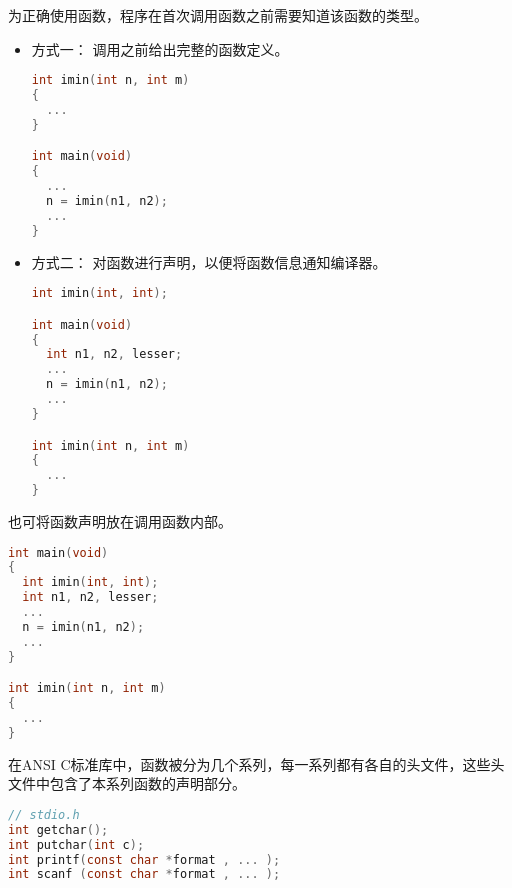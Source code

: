 \begin{frame}[fragile]
为正确使用函数，程序在首次调用函数之前需要知道该函数的类型。
\begin{itemize}
\item 方式一：
调用之前给出完整的函数定义。\\[0.1in]
\begin{lstlisting}[language=c,backgroundcolor=\color{red!10}]
int imin(int n, int m)
{
  ... 
}

int main(void)
{
  ...
  n = imin(n1, n2);
  ...
}
\end{lstlisting}
\end{itemize}
\end{frame}

\begin{frame}[fragile]
\begin{itemize}
\item 方式二：
对函数进行声明，以便将函数信息通知编译器。\\[0.1in]
\begin{lstlisting}[language=c,backgroundcolor=\color{red!10}]
int imin(int, int);

int main(void)
{
  int n1, n2, lesser;
  ...
  n = imin(n1, n2);
  ...
}

int imin(int n, int m)
{
  ... 
}
\end{lstlisting}
\end{itemize}
\end{frame}

\begin{frame}[fragile]
也可将函数声明放在调用函数内部。 
\begin{lstlisting}[language=c,backgroundcolor=\color{red!10}]
int main(void)
{
  int imin(int, int);
  int n1, n2, lesser;
  ...
  n = imin(n1, n2);
  ...
}

int imin(int n, int m)
{
  ... 
}
\end{lstlisting}
\end{frame}

\begin{frame}[fragile]
在ANSI C标准库中，函数被分为几个系列，每一系列都有各自的头文件，这些头文件中包含了本系列函数的声明部分。
\end{frame}

\begin{frame}[fragile]
  \begin{lstlisting}[language=c,backgroundcolor=\color{red!10}]
// stdio.h 
int getchar();
int putchar(int c);
int printf(const char *format , ... );
int scanf (const char *format , ... );
\end{lstlisting}
\end{frame}

